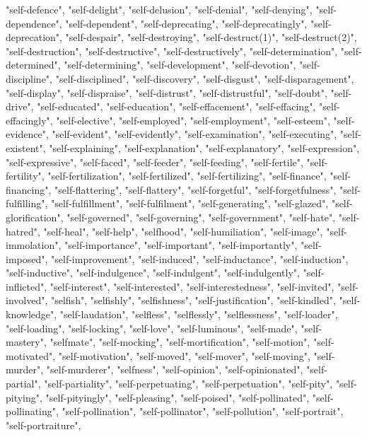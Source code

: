 "self-defence",
"self-delight",
"self-delusion",
"self-denial",
"self-denying",
"self-dependence",
"self-dependent",
"self-deprecating",
"self-deprecatingly",
"self-deprecation",
"self-despair",
"self-destroying",
"self-destruct(1)",
"self-destruct(2)",
"self-destruction",
"self-destructive",
"self-destructively",
"self-determination",
"self-determined",
"self-determining",
"self-development",
"self-devotion",
"self-discipline",
"self-disciplined",
"self-discovery",
"self-disgust",
"self-disparagement",
"self-display",
"self-dispraise",
"self-distrust",
"self-distrustful",
"self-doubt",
"self-drive",
"self-educated",
"self-education",
"self-effacement",
"self-effacing",
"self-effacingly",
"self-elective",
"self-employed",
"self-employment",
"self-esteem",
"self-evidence",
"self-evident",
"self-evidently",
"self-examination",
"self-executing",
"self-existent",
"self-explaining",
"self-explanation",
"self-explanatory",
"self-expression",
"self-expressive",
"self-faced",
"self-feeder",
"self-feeding",
"self-fertile",
"self-fertility",
"self-fertilization",
"self-fertilized",
"self-fertilizing",
"self-finance",
"self-financing",
"self-flattering",
"self-flattery",
"self-forgetful",
"self-forgetfulness",
"self-fulfilling",
"self-fulfillment",
"self-fulfilment",
"self-generating",
"self-glazed",
"self-glorification",
"self-governed",
"self-governing",
"self-government",
"self-hate",
"self-hatred",
"self-heal",
"self-help",
"selfhood",
"self-humiliation",
"self-image",
"self-immolation",
"self-importance",
"self-important",
"self-importantly",
"self-imposed",
"self-improvement",
"self-induced",
"self-inductance",
"self-induction",
"self-inductive",
"self-indulgence",
"self-indulgent",
"self-indulgently",
"self-inflicted",
"self-interest",
"self-interested",
"self-interestedness",
"self-invited",
"self-involved",
"selfish",
"selfishly",
"selfishness",
"self-justification",
"self-kindled",
"self-knowledge",
"self-laudation",
"selfless",
"selflessly",
"selflessness",
"self-loader",
"self-loading",
"self-locking",
"self-love",
"self-luminous",
"self-made",
"self-mastery",
"selfmate",
"self-mocking",
"self-mortification",
"self-motion",
"self-motivated",
"self-motivation",
"self-moved",
"self-mover",
"self-moving",
"self-murder",
"self-murderer",
"selfness",
"self-opinion",
"self-opinionated",
"self-partial",
"self-partiality",
"self-perpetuating",
"self-perpetuation",
"self-pity",
"self-pitying",
"self-pityingly",
"self-pleasing",
"self-poised",
"self-pollinated",
"self-pollinating",
"self-pollination",
"self-pollinator",
"self-pollution",
"self-portrait",
"self-portraiture",
